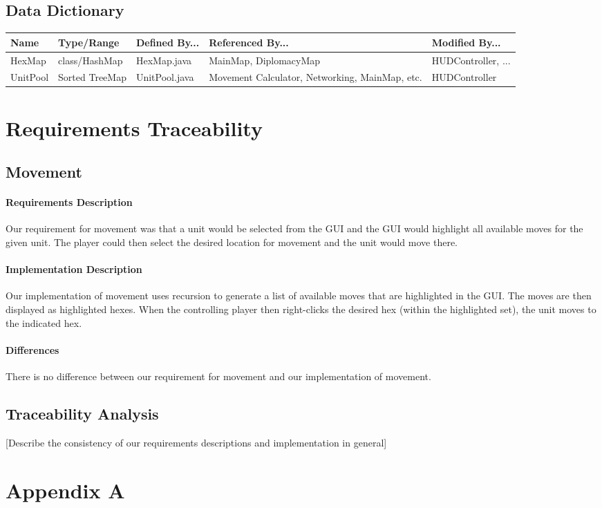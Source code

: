 \documentclass[12pt,a4paper]{article}
\begin{document}
\subsection{Data Dictionary}
\small{
\begin{center}
\noindent\begin{tabularx}{\linewidth}{|l|X|X|X|X|}\hline
\textbf{Name} & \textbf{Type/Range} & \textbf{Defined By...} & \textbf{Referenced By...} & \textbf{Modified By...}\\
\hline
HexMap & class/HashMap & HexMap.java & MainMap, DiplomacyMap & HUDController, ...\\
\hline
UnitPool & Sorted TreeMap & UnitPool.java & Movement Calculator, Networking, MainMap, etc. & HUDController\\
\hline
\end{tabularx}
\end{center}
}
	
\section{Requirements Traceability}
\subsection{Movement}
	\paragraph{Requirements Description} Our requirement for movement was that a unit would be selected from the GUI and the GUI would highlight all available moves for the given unit. The player could then select the desired location for movement and the unit would move there.
	\paragraph{Implementation Description} Our implementation of movement uses recursion to generate a list of available moves that are highlighted in the GUI. The moves are then displayed as highlighted hexes. When the controlling player then right-clicks the desired hex (within the highlighted set), the unit moves to the indicated hex. 
	\paragraph{Differences} There is no difference between our requirement for movement and our implementation of movement.

\subsection{Traceability Analysis}
[Describe the consistency of our requirements descriptions and implementation in general]

\section{Appendix A}
\end{document}
